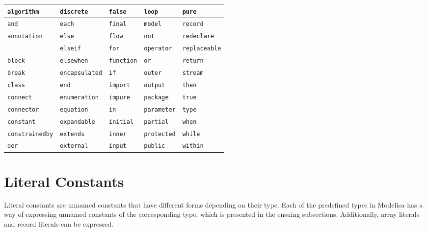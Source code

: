 \begin{longtable}[c]{@{}lllll@{}}
\lstinline!algorithm! & \lstinline!discrete! & \lstinline!false! & \lstinline!loop! & \lstinline!pure!\\ \hline
\lstinline!and! & \lstinline!each! & \lstinline!final! & \lstinline!model! & \lstinline!record!\\ \hline
\lstinline!annotation! & \lstinline!else! & \lstinline!flow! & \lstinline!not! & \lstinline!redeclare!\\ \hline
& \lstinline!elseif! & \lstinline!for! & \lstinline!operator! & \lstinline!replaceable!\\ \hline
\lstinline!block! & \lstinline!elsewhen! & \lstinline!function! & \lstinline!or! & \lstinline!return!\\ \hline
\lstinline!break! & \lstinline!encapsulated! & \lstinline!if! & \lstinline!outer! & \lstinline!stream!\\ \hline
\lstinline!class! & \lstinline!end! & \lstinline!import! & \lstinline!output! & \lstinline!then!\\ \hline
\lstinline!connect! & \lstinline!enumeration! & \lstinline!impure! & \lstinline!package! & \lstinline!true!\\ \hline
\lstinline!connector! & \lstinline!equation! & \lstinline!in! & \lstinline!parameter! & \lstinline!type!\\ \hline
\lstinline!constant! & \lstinline!expandable! & \lstinline!initial! & \lstinline!partial! & \lstinline!when!\\ \hline
\lstinline!constrainedby! & \lstinline!extends! & \lstinline!inner! & \lstinline!protected! & \lstinline!while!\\ \hline
\lstinline!der! & \lstinline!external! & \lstinline!input! & \lstinline!public! & \lstinline!within!\\ \hline
\end{longtable}

\section{Literal Constants}

Literal constants are unnamed constants that have different forms
depending on their type. Each of the predefined types in Modelica has a
way of expressing unnamed constants of the corresponding type, which is
presented in the ensuing subsections. Additionally, array literals and
record literals can be expressed.

